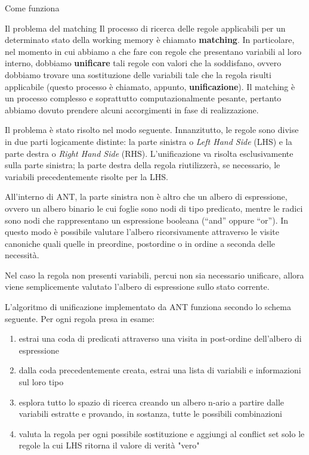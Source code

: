 \begin{chapter}{Come funziona}
\begin{section}{Il problema del matching}
\label{sec:matching}
Il processo di ricerca delle regole applicabili per un determinato stato della working
memory \`e chiamato \textbf{matching}. In particolare, nel momento in cui abbiamo a che
fare con regole che presentano variabili al loro interno, dobbiamo \textbf{unificare}
tali regole con valori che la soddisfano, ovvero dobbiamo trovare una sostituzione delle
variabili tale che la regola risulti applicabile (questo processo \`e chiamato, appunto,
\textbf{unificazione}). Il matching \`e un processo complesso e soprattutto
computazionalmente pesante, pertanto abbiamo dovuto prendere alcuni accorgimenti in fase
di realizzazione.

Il problema \`e stato risolto nel modo seguente. Innanzitutto, le regole sono
divise in due parti logicamente distinte: la parte sinistra o \textit{Left Hand Side}
(LHS) e la parte destra o \textit{Right Hand Side} (RHS).
L'unificazione va risolta esclusivamente sulla parte sinistra; la parte destra
della regola riutilizzer\`a, se necessario, le variabili precedentemente risolte
per la LHS.

All'interno di ANT, la parte sinistra non \`e altro che un albero di espressione, ovvero
un albero binario le cui foglie sono nodi di tipo predicato, mentre le radici sono
nodi che rappresentano un espressione booleana (``and'' oppure ``or''). In questo modo
\`e possibile valutare l'albero ricorsivamente attraverso le visite canoniche quali
quelle in preordine, postordine o in ordine a seconda delle necessit\`a.

Nel caso la regola non presenti variabili, percui non sia necessario unificare, allora
viene semplicemente valutato l'albero di espressione sullo stato corrente.

L'algoritmo di unificazione implementato da ANT funziona secondo lo schema seguente.
Per ogni regola presa in esame:

\begin{enumerate}
	\item estrai una coda di predicati attraverso una visita in post-ordine
	      dell'albero di espressione
	\item dalla coda precedentemente creata, estrai una lista di variabili
	      e informazioni sul loro tipo
	\item esplora tutto lo spazio di ricerca creando un albero n-ario a partire
        dalle variabili estratte e provando, in sostanza, tutte le possibili
        combinazioni
	\item valuta la regola per ogni possibile sostituzione e aggiungi al
        conflict set solo le regole la cui LHS ritorna il valore di verit\`a "vero"
\end{enumerate}


\end{section}
\end{chapter}
